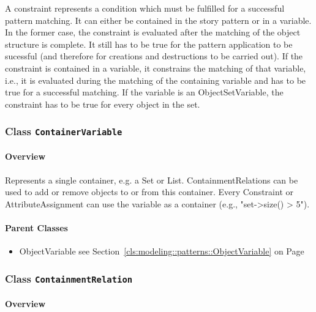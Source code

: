 	
			
A constraint represents a condition which must be fulfilled for a successful pattern matching. It can either be contained in the story pattern or in a variable. In the former case, the constraint is evaluated after the matching of the object structure is complete. It still has to be true for the pattern application to be sucessful (and therefore for creations and destructions to be carried out). If the constraint is contained in a variable, it constrains the matching of that variable, i.e., it is evaluated during the matching of the containing variable and has to be true for a successful matching. If the variable is an ObjectSetVariable, the constraint has to be true for every object in the set.	
		
	



\subsubsection{\Large{Class \bfseries \texttt{ContainerVariable}\normalfont}}
\label{cls:modeling::patterns::ContainerVariable} 
\paragraph{Overview}

	
			
Represents a single container, e.g. a Set or List. ContainmentRelations can be used to add or remove objects to or from this container.
Every Constraint or AttributeAssignment can use the variable as a container (e.g., "set->size() > 5").	
		
	



\paragraph{Parent Classes}
\begin{itemize}
\item ObjectVariable see Section~\ref{cls:modeling::patterns::ObjectVariable} on Page~\pageref{cls:modeling::patterns::ObjectVariable}\end{itemize}
\subsubsection{\Large{Class \bfseries \texttt{ContainmentRelation}\normalfont}}
\label{cls:modeling::patterns::ContainmentRelation} 
\paragraph{Overview}

